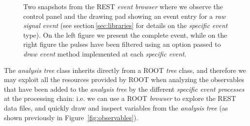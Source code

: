 \begin{figure}[h]
  \centering
	\caption{Two snapshots from the REST \emph{event browser} where we observe the control panel and the drawing pad showing an event entry for a \emph{raw signal event} (see section\,\ref{sec:libraries} for details on the \emph{specific event} type). On the left figure we present the complete event, while on the right figure the pulses have been filtered using an option passed to \emph{draw event} method implemented at each \emph{specific event}.}\label{fig:eventBrowser}
\end{figure}


The \emph{analysis tree} class inherits directly from a ROOT \emph{tree} class, and therefore we may exploit all the resources provided by ROOT when analyzing the observables that have been added to the \emph{analysis tree} by the different \emph{specific event processes} at the processing chain: i.e. we can use a ROOT \emph{browser} to explore the REST data files, and quickly draw and inspect variables from the \emph{analysis tree} (as shown previously in Figure~\ref{fig:observables}).

